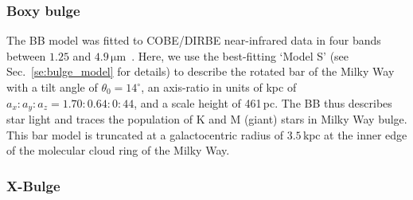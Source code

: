 \documentclass[doublespace,nopageskip]{VTthesis}
\newcommand{\mrm}[1]{\mathrm{#1}}
\DeclareMathOperator\sech{sech}
\begin{document}
\subsubsection{Boxy bulge}





The {BB} model was fitted to COBE/DIRBE near-infrared data in four bands between $1.25$ and $4.9\,\mrm{\mu m}$~\citet{1998ApJ...492..495F}.
%
Here, we use the best-fitting `Model S' (see Sec.~\ref{se:bulge_model} for details) to describe the rotated bar of the Milky Way with a tilt angle of $\theta_0 = 14^{\circ}$, an axis-ratio in units of kpc of $a_x : a_y : a_z = 1.70 : 0.64 : 0:44$, and a scale height of 461\,pc.
%
The {BB} thus describes star light and traces the population of K and M (giant) stars in Milky Way bulge.
%
This bar model is truncated at a galactocentric radius of $3.5\,\mrm{kpc}$ at the inner edge of the molecular cloud ring of the Milky Way. 


\subsubsection{X-Bulge}
\end{document}
